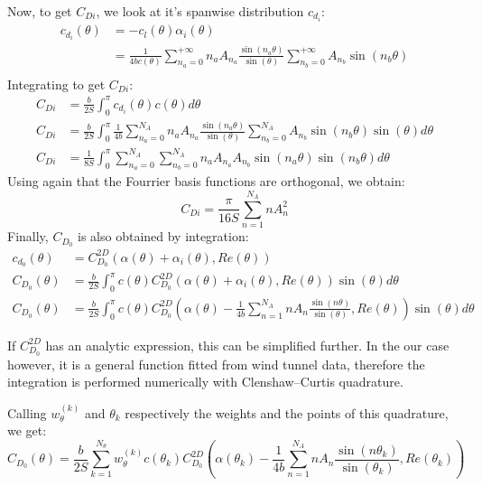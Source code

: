 \documentclass[letterpaper,12pt]{article}
\begin{document}
\noindent Now, to get $C_{Di}$, we look at it's spanwise distribution $c_{d_i}$:
\begin{align*}
	c_{d_i} (\theta) &= - c_l (\theta) \alpha_i (\theta) \\
					&=  \frac{1}{4bc(\theta)}\sum_{n_a=0}^{+\infty} n_a A_{n_a} \frac{ \sin(n_a\theta) }{\sin(\theta)} \sum_{n_b=0}^{+\infty} A_{n_b} \sin(n_b\theta) \\
\end{align*}
Integrating to get $C_{Di}$:
\begin{align}
	C_{Di} &= \frac b {2S} \int_{0}^{\pi} c_{d_i}(\theta) c(\theta) d\theta \nonumber\\
	C_{Di} &= \frac b {2S} \int_{0}^{\pi} \frac{1}{4b}
		\sum_{n_a=0}^{N_A} n_a A_{n_a} \frac{ \sin(n_a\theta) }{\sin(\theta)} 
		\sum_{n_b=0}^{N_A} A_{n_b} \sin(n_b\theta) \sin(\theta) 
		d\theta  \nonumber \\ 
	C_{Di} &= \frac 1 {8S} \int_{0}^{\pi} \sum_{n_a=0}^{N_A} \sum_{n_b=0}^{N_A} n_a A_{n_a}A_{n_b} \sin(n_a\theta) \sin(n_b\theta) d\theta
\end{align}
Using again that the Fourrier basis functions are orthogonal, we obtain:
%
\begin{equation}
	\label{eq:cdi}
	C_{Di} = \frac {\pi}{16S} \sum_{n=1}^{N_A} n A_{n}^2
\end{equation}
%
Finally, $C_{D_0}$ is also obtained by integration:
%
\begin{align*}
	c_{d_0}(\theta) &= C_{D_0}^{2D}\left( \alpha(\theta) + \alpha_i(\theta), Re(\theta)\right) \\
	C_{D_0}(\theta) &= \frac b {2S} \int_{0}^{\pi} c(\theta) C_{D_0}^{2D}\left( \alpha(\theta) + \alpha_i(\theta), Re(\theta)\right) \sin(\theta) d\theta \\
	C_{D_0}(\theta) &= \frac b {2S} \int_{0}^{\pi} c(\theta) C_{D_0}^{2D}\left( \alpha(\theta) - \frac {1}{4b}  \sum_{n=1}^{N_A} n A_n \frac{ \sin(n\theta) }{\sin(\theta)} , Re(\theta)\right) \sin(\theta) d\theta
\end{align*}

If $C_{D_0}^{2D}$ has an analytic expression, this can be simplified further.
In the our case however, it is a general function fitted from wind tunnel data, 
therefore the integration is performed numerically with Clenshaw–Curtis quadrature. 

Calling $w_{\theta}^{(k)}$ and $\theta_k$ respectively the weights and the points of this quadrature, we get:
\begin{equation}
	\label{eq:cd0}
	C_{D_0}(\theta) = \frac b {2S} \sum_{k=1}^{N_{\theta}} w_{\theta}^{(k)} c(\theta_k) C_{D_0}^{2D}\left( \alpha(\theta_k) - \frac {1}{4b} \sum_{n=1}^{N_A} n A_n \frac{ \sin(n\theta_k) }{\sin(\theta_k)} , Re(\theta_k)\right)
\end{equation}
\end{document}
